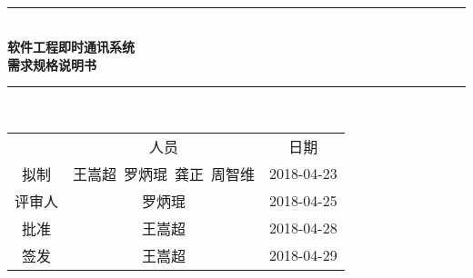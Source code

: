 \documentclass[bachelor]{ustcthesis}
\newcommand{\docname}{软件工程即时通讯系统}
\newcommand{\HRule}{\rule{\linewidth}{0.5mm}}
\begin{document}
\begin{titlepage}
\begin{center}
~\\[5cm]
\HRule \\[0.4cm]
{\huge \bfseries \docname\\需求规格说明书}\\[0.4cm]
\HRule \\[1.5cm]

\begin{tabular}{ccc}
  & 人员 & 日期 \\ 
拟制 & 王嵩超\ 罗炳琨\ 龚正\ 周智维 & 2018-04-23 \\ 
评审人 & 罗炳琨 & 2018-04-25 \\ 
批准 & 王嵩超& 2018-04-28 \\ 
签发 & 王嵩超& 2018-04-29 \\ 
\end{tabular} 

\end{center}
\end{titlepage}



\frontmatter

\tableofcontents
\listoffigures
\listoftables
% 

\mainmatter









%
% 

\appendix


\end{document}
